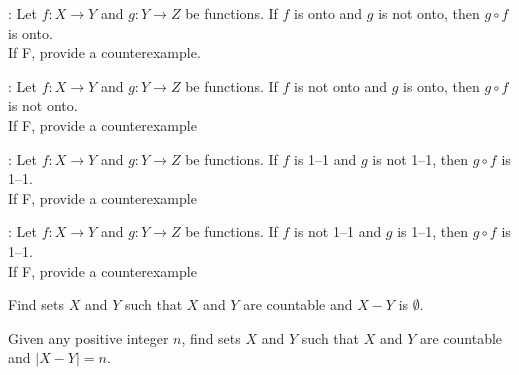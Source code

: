 \nextq
\tf:
Let $f : X \rightarrow Y$ and $g: Y \rightarrow Z$ be functions.
If $f$ is onto and $g$ is not onto, then $g \circ f$ is onto.
\dotfill\answerbox{}
\\
If F, provide a counterexample.
\begin{answerlong}

\end{answerlong}

\nextq
\tf:
Let $f : X \rightarrow Y$ and $g: Y \rightarrow Z$ be functions.
If $f$ is not onto and $g$ is onto, then $g \circ f$ is not onto.
\dotfill\answerbox{}
\\
If F, provide a counterexample
\begin{answerlong}

\end{answerlong}

\nextq
\tf:
Let $f : X \rightarrow Y$ and $g: Y \rightarrow Z$ be functions.
If $f$ is 1--1 and $g$ is not 1--1, then $g \circ f$ is 1--1.
\dotfill\answerbox{}
\\
If F, provide a counterexample
\begin{answerlong}

\end{answerlong}

\nextq
\tf:
Let $f : X \rightarrow Y$ and $g: Y \rightarrow Z$ be functions.
If $f$ is not 1--1 and $g$ is 1--1, then $g \circ f$ is 1--1.
\dotfill\answerbox{}
\\
If F, provide a counterexample
\begin{answerlong}

\end{answerlong}

\nextq
Find sets $X$ and $Y$ such that 
$X$ and $Y$ are countable and $X - Y$ is $\emptyset$.
\begin{answerlong}
\end{answerlong}

\nextq
Given any positive integer $n$,
find sets $X$ and $Y$ such that 
$X$ and $Y$ are countable and $|X - Y| = n$.
\begin{answerlong}

\end{answerlong}

